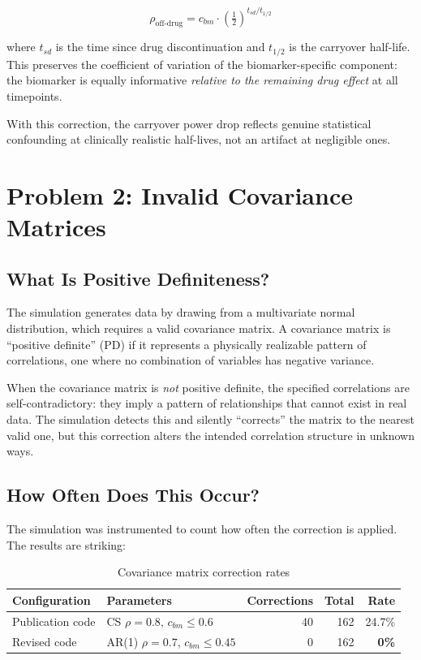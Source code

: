 \documentclass[11pt]{article}
\begin{document}
\[
\rho_{\text{off-drug}} = c_{bm} \cdot
  \left(\tfrac{1}{2}\right)^{t_{sd}/t_{1/2}}
\]

where $t_{sd}$ is the time since drug discontinuation and
$t_{1/2}$ is the carryover half-life. This preserves the
coefficient of variation of the biomarker-specific component:
the biomarker is equally informative \emph{relative to the
remaining drug effect} at all timepoints.

With this correction, the carryover power drop reflects
genuine statistical confounding at clinically realistic
half-lives, not an artifact at negligible ones.

\section{Problem 2: Invalid Covariance Matrices}

\subsection{What Is Positive Definiteness?}

The simulation generates data by drawing from a multivariate
normal distribution, which requires a valid covariance matrix.
A covariance matrix is ``positive definite'' (PD) if it
represents a physically realizable pattern of correlations, one
where no combination of variables has negative variance.

When the covariance matrix is \emph{not} positive definite, the
specified correlations are self-contradictory: they imply a
pattern of relationships that cannot exist in real data. The
simulation detects this and silently ``corrects'' the matrix to
the nearest valid one, but this correction alters the intended
correlation structure in unknown ways.

\subsection{How Often Does This Occur?}

The simulation was instrumented to count how often the
correction is applied. The results are striking:

\begin{table}[h]
\centering
\caption{Covariance matrix correction rates}
\begin{tabular}{llrrr}
\toprule
Configuration & Parameters & Corrections & Total & Rate \\
\midrule
Publication code & CS $\rho=0.8$, $c_{bm} \leq 0.6$ &
  40 & 162 & 24.7\% \\
Revised code & AR(1) $\rho=0.7$, $c_{bm} \leq 0.45$ &
  0 & 162 & \textbf{0\%} \\
\bottomrule
\end{tabular}
\end{table}
\end{document}
